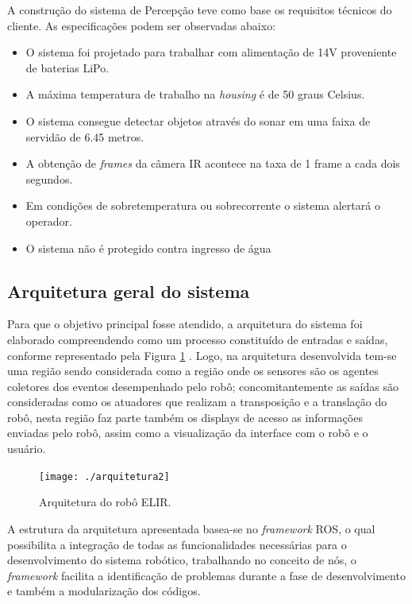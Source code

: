 A construção do sistema de Percepção teve como base os requisitos técnicos do cliente. As especificações podem ser observadas abaixo:
\begin{itemize}
\item O sistema foi projetado para trabalhar com alimentação de 14V proveniente de baterias LiPo.
\item A máxima temperatura de trabalho na \textit{housing} é de 50 graus Celsius.
\item O sistema consegue detectar objetos através do sonar em uma faixa de servidão de 6.45 metros.
\item A obtenção de \textit{frames} da câmera IR acontece na taxa de 1 frame a cada dois segundos.
\item Em condições de sobretemperatura ou sobrecorrente o sistema alertará o operador.
\item O sistema não é protegido contra ingresso de água
\end{itemize} 

\subsection{Arquitetura geral do sistema}
\label{ssec:arqg}
Para que o objetivo principal fosse atendido, a arquitetura do sistema foi elaborado compreendendo como um processo constituído de entradas e saídas, conforme representado pela Figura \ref{img:elirarq} . Logo, na arquitetura desenvolvida tem-se uma região sendo considerada como a região onde os sensores são os agentes coletores dos eventos desempenhado pelo robô; concomitantemente as saídas são consideradas como os atuadores que realizam a transposição e a translação do robô, nesta região faz parte também os displays de acesso as informações enviadas pelo robô, assim como a visualização da interface com o robô e o usuário.

\begin{figure} [h!]	
	\caption{Arquitetura do robô ELIR.}
	\label{img:elirarq}											 
	\centering													 
	\texttt{[image: ./arquitetura2]}
\end{figure}													 



A estrutura da arquitetura apresentada basea-se no \textit{framework} ROS, o qual possibilita a integração de todas as funcionalidades necessárias para o desenvolvimento do sistema robótico, trabalhando no conceito de nós, o \textit{framework} facilita a identificação de problemas durante a fase de desenvolvimento e também a modularização dos códigos.


